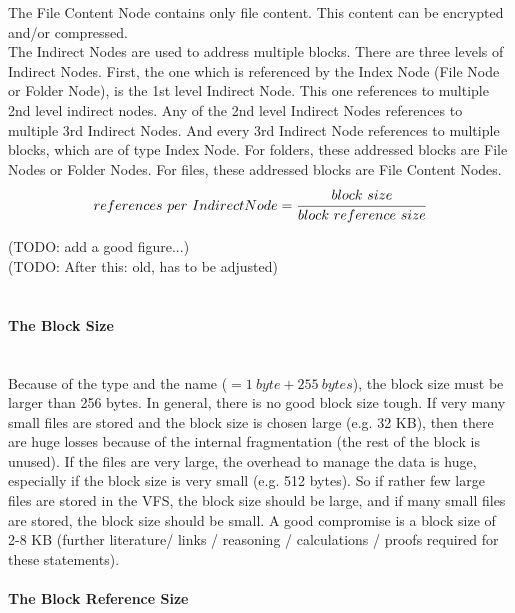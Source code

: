 The File Content Node contains only file content. This content can be encrypted and/or compressed.\\

The Indirect Nodes are used to address multiple blocks. There are three levels of Indirect Nodes. First, the one which is referenced by the Index Node (File Node or Folder Node), is the 1st level Indirect Node. This one references to multiple 2nd level indirect nodes. Any of the 2nd level Indirect Nodes references to multiple 3rd Indirect Nodes. And every 3rd Indirect Node references to multiple blocks, which are of type Index Node. For folders, these addressed blocks are File Nodes or Folder Nodes. For files, these addressed blocks are File Content Nodes.\\

$$references\ per\ Indirect Node = \cfrac{block\ size}{block\ reference\ size}$$



(TODO: add a good figure...)\\

(TODO: After this: old, has to be adjusted)\\
\\




\paragraph{The Block Size} ~\\

\noindent Because of the type and the name ($ = 1\ byte + 255\ bytes$), the block size must be larger than 256 bytes. In general, there is no good block size tough. If very many small files are stored and the block size is chosen  large (e.g. 32 KB), then there are huge losses because of the internal fragmentation (the rest of the block is unused). If the files are very large, the overhead to manage the data is huge, especially if the block size is very small (e.g. 512 bytes). So if rather few large files are stored in the VFS, the block size should be large, and if many small files are stored, the block size should be small. A good compromise is a block size of 2-8 KB (further literature/ links / reasoning / calculations / proofs required for these statements).

\paragraph{The Block Reference Size} ~\\

